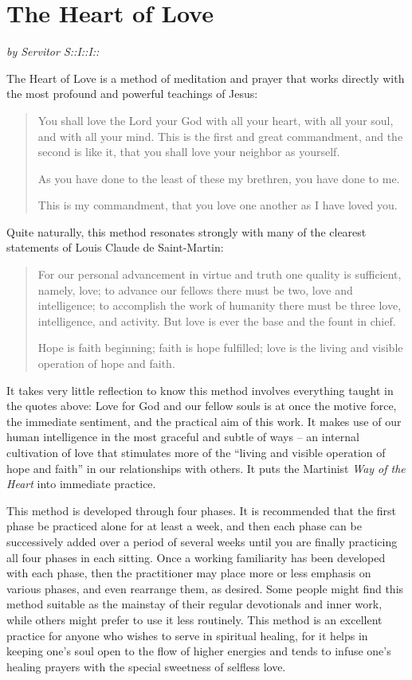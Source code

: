 \section{The Heart of Love}

\textit{by Servitor S::I::I::}

The Heart of Love is a method of meditation and prayer that works directly with the most
profound and powerful teachings of Jesus: 

\begin{quote}
	You shall love the Lord your God with all your heart, with all your soul, and with
	all your mind. This is the first and great commandment, and the second is like it,
	that you shall love your neighbor as yourself.
	
	As you have done to the least of these my brethren, you have done to me.
	
	This is my commandment, that you love one another as I have loved you.
\end{quote}

Quite naturally, this method resonates strongly with many of the clearest statements of
Louis Claude de Saint-Martin:

\begin{quote}
	For our personal advancement in virtue and truth one quality is sufficient,
	namely, love; to advance our fellows there must be two, love and intelligence; to
	accomplish the work of humanity there must be three love, intelligence, and
	activity. But love is ever the base and the fount in chief.
	
	Hope is faith beginning; faith is hope fulfilled; love is the living and visible
	operation of hope and faith.
\end{quote}

It takes very little reflection to know this method involves everything taught in the quotes
above: Love for God and our fellow souls is at once the motive force, the immediate
sentiment, and the practical aim of this work. It makes use of our human intelligence in
the most graceful and subtle of ways – an internal cultivation of love that stimulates more
of the “living and visible operation of hope and faith” in our relationships with others. It
puts the Martinist \textit{Way of the Heart} into immediate practice.

This method is developed through four phases. It is recommended that the first phase be
practiced alone for at least a week, and then each phase can be successively added over a
period of several weeks until you are finally practicing all four phases in each sitting.
Once a working familiarity has been developed with each phase, then the practitioner
may place more or less emphasis on various phases, and even rearrange them, as desired.
Some people might find this method suitable as the mainstay of their regular devotionals
and inner work, while others might prefer to use it less routinely. This method is an
excellent practice for anyone who wishes to serve in spiritual healing, for it helps in
keeping one’s soul open to the flow of higher energies and tends to infuse one’s healing
prayers with the special sweetness of selfless love.

